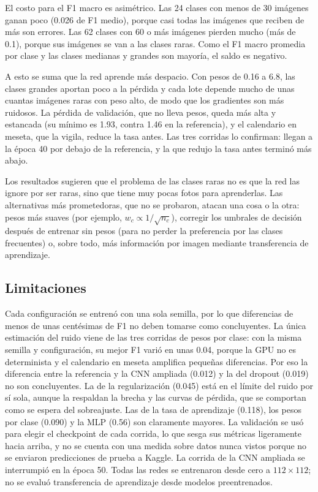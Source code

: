 El costo para el F1 macro es asimétrico. Las 24 clases con menos de 30 imágenes
ganan poco (0.026 de F1 medio), porque casi todas las imágenes que reciben de
más son errores. Las 62 clases con 60 o más imágenes pierden mucho (más de 0.1),
porque sus imágenes se van a las clases raras. Como el F1 macro promedia por
clase y las clases medianas y grandes son mayoría, el saldo es negativo.

A esto se suma que la red aprende más despacio. Con pesos de 0.16 a 6.8, las
clases grandes aportan poco a la pérdida y cada lote depende mucho de unas
cuantas imágenes raras con peso alto, de modo que los gradientes son más
ruidosos. La pérdida de validación, que no lleva pesos, queda más alta y
estancada (su mínimo es 1.93, contra 1.46 en la referencia), y el calendario en
meseta, que la vigila, reduce la tasa antes. Las tres corridas lo confirman:
llegan a la época 40 por debajo de la referencia, y la que redujo la tasa antes
terminó más abajo.

Los resultados sugieren que el problema de las clases raras no es que la red
las ignore por ser raras, sino que tiene muy pocas fotos para aprenderlas. Las
alternativas más prometedoras, que no se probaron, atacan una cosa o la otra:
pesos más suaves (por ejemplo, $w_c \propto 1/\sqrt{n_c}$), corregir los
umbrales de decisión después de entrenar sin pesos (para no perder la
preferencia por las clases frecuentes) o, sobre todo, más información por
imagen mediante transferencia de aprendizaje.

\subsection{Limitaciones}

Cada configuración se entrenó con una sola semilla, por lo que diferencias de
menos de unas centésimas de F1 no deben tomarse como concluyentes. La única
estimación del ruido viene de las tres corridas de pesos por clase: con la
misma semilla y configuración, su mejor F1 varió en unas 0.04, porque la GPU no
es determinista y el calendario en meseta amplifica pequeñas diferencias. Por
eso la diferencia entre la referencia y la CNN ampliada (0.012) y la del
dropout (0.019) no son concluyentes. La de la regularización (0.045) está en el
límite del ruido por sí sola, aunque la respaldan la brecha y las curvas de
pérdida, que se comportan como se espera del sobreajuste. Las de la tasa de
aprendizaje (0.118), los pesos por clase (0.090) y la MLP (0.56) son claramente
mayores. La
validación se usó para elegir el checkpoint de cada corrida, lo que sesga sus
métricas ligeramente hacia arriba, y no se cuenta con una medida sobre datos
nunca vistos porque no se enviaron predicciones de prueba a Kaggle. La
corrida de la CNN ampliada se interrumpió en la época 50. Todas las redes se
entrenaron desde cero a $112\times112$; no se evaluó transferencia de
aprendizaje desde modelos preentrenados.
